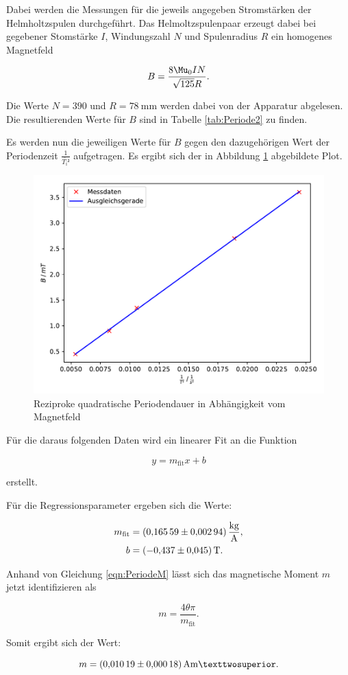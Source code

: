 Dabei werden die Messungen für die jeweils angegeben Stromstärken der 
Helmholtzspulen durchgeführt. Das Helmoltzspulenpaar erzeugt dabei bei gegebener 
Stomstärke $I$, Windungszahl $N$ und Spulenradius $R$ ein homogenes Magnetfeld

\begin{equation*}
B = \frac{8 \Mu_0 I N}{\sqrt{125} R}.
\end{equation*}

Die Werte $N = 390$ und $R = \SI{78}{\milli\meter}$ werden dabei von der 
Apparatur abgelesen. Die resultierenden Werte für $B$ sind in Tabelle 
\ref{tab:Periode2} zu finden. 

Es werden nun die jeweiligen Werte für $B$ gegen den dazugehörigen Wert der
Periodenzeit $\frac{1}{\bar{T_\text{i}}²}$ aufgetragen. Es ergibt sich der in 
Abbildung \ref{fig:plot1} abgebildete Plot. 

\begin{figure}
  \centering
  \includegraphics[scale=0.8]{content/plot1.pdf}
  \caption{Reziproke quadratische Periodendauer in Abhängigkeit vom Magnetfeld}
  \label{fig:plot1}
\end{figure}

Für die daraus folgenden Daten wird ein linearer Fit an die Funktion

\begin{equation*}
y = m_\text{fit}x+b
\end{equation*}

erstellt. 

Für die Regressionsparameter ergeben sich die Werte:

\begin{align*}
m_\text{fit} &= \SI{0.16559+-0.00294}{\kilo\gram\per\ampere},\\
b &= \SI{-0.437+-0.045}{\tesla}.
\end{align*}

Anhand von Gleichung \eqref{eqn:PeriodeM} lässt sich das magnetische Moment $m$ jetzt identifizieren als 

\begin{equation*}
m = \frac{4\theta\pi}{m_\text{fit}}.
\end{equation*}

Somit ergibt sich der Wert: 

\begin{equation*}
m = \SI{0.01019+-0.00018}{\ampere\meter²}.
\end{equation*}